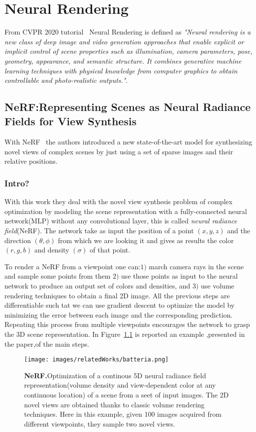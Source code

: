 \chapter{Neural Rendering}\label{sec:Neural}
From CVPR 2020 tutorial~\cite{CVPRtutorial} Neural Rendering is defined as \textit{"Neural rendering
 is a new class of deep image and video generation approaches that 
 enable explicit or implicit control of scene properties such as 
 illumination, camera parameters, pose, geometry, appearance, and 
 semantic structure. It combines generative machine learning techniques 
 with physical knowledge from computer graphics to obtain controllable 
 and photo-realistic outputs."}.

\section{NeRF:Representing Scenes as Neural Radiance Fields for View Synthesis}\label{sec:nerf}
With NeRF~\cite{nerf} the authors introduced a new state-of-the-art model
for synthesizing novel views of complex scenes by just using a set of sparse
images and their relative positions.
\subsection{Intro?}
With this work they deal with the novel view synthesis problem of complex optimization
by modeling the scene representation with a fully-connected neural network(MLP) without any
convolutional layer, this is called \textit{neural radiance field}(NeRF). The network
take as input the position of a point $(x,y,z)$ and the direction $(\theta,\phi)$ from which we are looking it
and gives as results the color$(r,g,b)$ and density $(\sigma)$ of that point. 

To render a NeRF from a viewpoint one can:$1)$ march camera rays in the 
scene and sample some points from them $2)$ use those points as input to the neural
network to produce an output set of colors and densities, and $3)$ use volume 
rendering techniques to obtain a final 2D image. All the previous steps
are differentiable such tat we can use gradient descent to optimize the model
by minimizing the error between each image and the corresponding prediction.
Repeating this process from multiple viewpoints encourages the network to 
grasp the 3D scene representation. In Figure~\ref{fig:batteria} is reported an example
,presented in the paper,of the main steps.
\begin{figure}
    \centering
    \texttt{[image: images/relatedWorks/batteria.png]} 
    \caption{\textbf{NeRF.}Optimization of a continous 5D neural radiance field
    representation(volume density and view-dependent color at any continuous location)
    of a scene from a seet of input images. The 2D novel views are obtained thanks
    to classic volume rendering techniques. Here in this example, given 100
    images acquired from different viewpoints, they sample two novel views.}\label{fig:batteria}
\end{figure}


